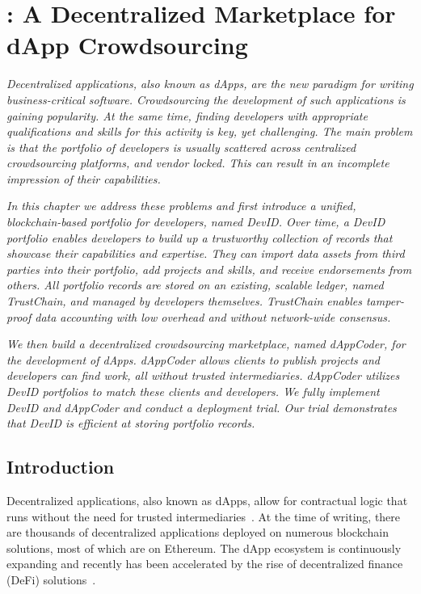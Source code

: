 \chapter{\Dappcoder{}: A Decentralized Marketplace for dApp Crowdsourcing}
\label{chapter:devid}

\emph{Decentralized applications, also known as dApps, are the new paradigm for writing business-critical software.
Crowdsourcing the development of such applications is gaining popularity.
At the same time, finding developers with appropriate qualifications and skills for this activity is key, yet challenging.
The main problem is that the portfolio of developers is usually scattered across centralized crowdsourcing platforms, and vendor locked.
This can result in an incomplete impression of their capabilities.}

\emph{In this chapter we address these problems and first introduce a unified, blockchain-based portfolio for developers, named \emph{DevID}.
Over time, a DevID portfolio enables developers to build up a trustworthy collection of records that showcase their capabilities and expertise.
They can import data assets from third parties into their portfolio, add projects and skills, and receive endorsements from others.
All portfolio records are stored on an existing, scalable ledger, named TrustChain, and managed by developers themselves.
TrustChain enables tamper-proof data accounting with low overhead and without network-wide consensus.}

\emph{We then build a decentralized crowdsourcing marketplace, named \emph{dAppCoder}, for the development of dApps.
dAppCoder allows clients to publish projects and developers can find work, all without trusted intermediaries.
dAppCoder utilizes DevID portfolios to match these clients and developers.
We fully implement DevID and dAppCoder and conduct a deployment trial.
Our trial demonstrates that DevID is efficient at storing portfolio records. }

\newpage

\section{Introduction}
\label{sec:introduction}
Decentralized applications, also known as dApps, allow for contractual logic that runs without the need for trusted intermediaries~\cite{raval2016decentralized}.
At the time of writing, there are thousands of decentralized applications deployed on numerous blockchain solutions, most of which are on Ethereum.
The dApp ecosystem is continuously expanding and recently has been accelerated by the rise of decentralized finance (DeFi) solutions~\cite{zetzsche2020decentralized}.

